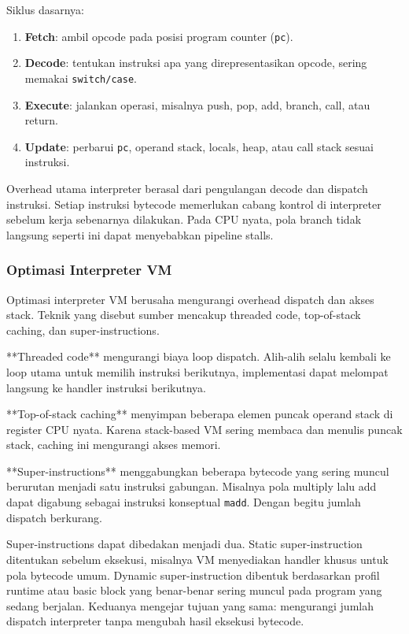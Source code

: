 Siklus dasarnya:
\begin{enumerate}
    \item \textbf{Fetch}: ambil opcode pada posisi program counter (\texttt{pc}).
    \item \textbf{Decode}: tentukan instruksi apa yang direpresentasikan opcode, sering memakai \texttt{switch/case}.
    \item \textbf{Execute}: jalankan operasi, misalnya push, pop, add, branch, call, atau return.
    \item \textbf{Update}: perbarui \texttt{pc}, operand stack, locals, heap, atau call stack sesuai instruksi.
\end{enumerate}

Overhead utama interpreter berasal dari pengulangan decode dan dispatch instruksi. Setiap instruksi bytecode memerlukan cabang kontrol di interpreter sebelum kerja sebenarnya dilakukan. Pada CPU nyata, pola branch tidak langsung seperti ini dapat menyebabkan pipeline stalls.

\subsubsection{Optimasi Interpreter VM}

\begin{jawab}
Optimasi interpreter VM berusaha mengurangi overhead dispatch dan akses stack. Teknik yang disebut sumber mencakup threaded code, top-of-stack caching, dan super-instructions.
\end{jawab}

**Threaded code** mengurangi biaya loop dispatch. Alih-alih selalu kembali ke loop utama untuk memilih instruksi berikutnya, implementasi dapat melompat langsung ke handler instruksi berikutnya.

**Top-of-stack caching** menyimpan beberapa elemen puncak operand stack di register CPU nyata. Karena stack-based VM sering membaca dan menulis puncak stack, caching ini mengurangi akses memori.

**Super-instructions** menggabungkan beberapa bytecode yang sering muncul berurutan menjadi satu instruksi gabungan. Misalnya pola multiply lalu add dapat digabung sebagai instruksi konseptual \texttt{madd}. Dengan begitu jumlah dispatch berkurang.

Super-instructions dapat dibedakan menjadi dua. Static super-instruction ditentukan sebelum eksekusi, misalnya VM menyediakan handler khusus untuk pola bytecode umum. Dynamic super-instruction dibentuk berdasarkan profil runtime atau basic block yang benar-benar sering muncul pada program yang sedang berjalan. Keduanya mengejar tujuan yang sama: mengurangi jumlah dispatch interpreter tanpa mengubah hasil eksekusi bytecode.

